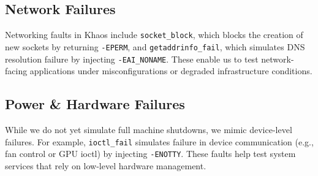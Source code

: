 \subsection{Network Failures}

Networking faults in Khaos include \texttt{socket\_block}, which blocks the creation of new sockets by returning \texttt{-EPERM}, and \texttt{getaddrinfo\_fail}, which simulates DNS resolution failure by injecting \texttt{-EAI\_NONAME}. These enable us to test network-facing applications under misconfigurations or degraded infrastructure conditions.


\begin{table}[ht]
\centering
\caption{Network Failures (Connectivity)}
\label{network_failures}
\end{table}

\subsection{Power \& Hardware Failures}

While we do not yet simulate full machine shutdowns, we mimic device-level failures. For example, \texttt{ioctl\_fail} simulates failure in device communication (e.g., fan control or GPU ioctl) by injecting \texttt{-ENOTTY}. These faults help test system services that rely on low-level hardware management.



